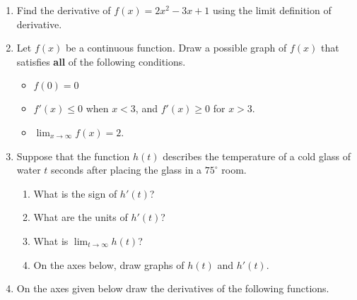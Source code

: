 \documentclass[11pt]{article}
\begin{document}
\drawtitle
\begin{enumerate}

\item Find the derivative of $f(x)=2x^2-3x+1$ using the limit
  definition of derivative.

  \vfill

\item Let $f(x)$ be a continuous function.  Draw a possible graph of
  $f(x)$ that satisfies \textbf{all} of the following conditions.
  \begin{itemize}
  \item $f(0)=0$
  \item $f'(x)\leq 0$ when $x<3$, and $f'(x)\geq 0$ for $x>3$.
  \item $\displaystyle\lim_{x\rightarrow\infty} f(x)=2$.
  \end{itemize}
  \begin{center}
  \end{center}


\newpage

\item Suppose that the function $h(t)$ describes the temperature of a
  cold glass of water $t$ seconds after placing the glass in a $75^\circ$ room.
  
  \begin{enumerate}
  \item What is the sign of $h'(t)$?
    \vfill
  \item What are the units of $h'(t)$?
    \vfill
  \item What is $\displaystyle\lim_{t\to\infty} h(t)$?
    \vfill
  \item On the axes below, draw graphs of $h(t)$ and $h'(t)$.
  \begin{center}
  \end{center}
  \end{enumerate}

\newpage

\item On the axes given below draw the derivatives of the following
  functions.


\end{enumerate}
\end{document}
